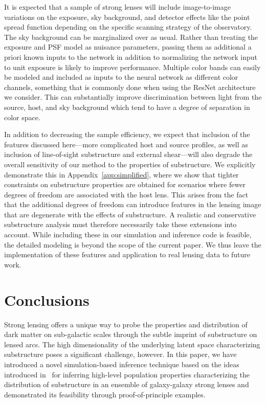 \documentclass[twocolumn]{aastex63}
\begin{document}
It is expected that a sample of strong lenses will include image-to-image variations on the exposure, sky background, and detector effects like the point spread function depending on the specific scanning strategy of the observatory. The sky background can be marginalized over as usual. Rather than treating the exposure and PSF model as nuisance parameters, passing them as additional a priori known inputs to the network in addition to normalizing the network input to unit exposure is likely to improve performance. Multiple color bands can easily be modeled and included as inputs to the neural network as different color channels, something that is commonly done when using the ResNet architecture we consider. This can substantially improve discrimination between light from the source, host, and sky background which tend to have a degree of separation in color space.

In addition to decreasing the sample efficiency, we expect that inclusion of the features discussed here---more complicated host and source profiles, as well as inclusion of line-of-sight substructure and external shear---will also degrade the overall sensitivity of our method to the properties of substructure. We explicitly demonstrate this in Appendix~\ref{app:simplified}, where we show that tighter constraints on substructure properties are obtained for scenarios where fewer degrees of freedom are associated with the host lens. This arises from the fact that the additional degrees of freedom can introduce features in the lensing image that are degenerate with the effects of substructure. A realistic and conservative substructure analysis must therefore necessarily take these extensions into account. While including these in our simulation and inference code is feasible, the detailed modeling is beyond the scope of the current paper. We thus leave the implementation of these features and application to real lensing data to future work.

\section{Conclusions}
\label{sec:conclusions}

Strong lensing offers a unique way to probe the properties and distribution of dark matter on sub-galactic scales through the subtle imprint of substructure on lensed arcs. The high dimensionality of the underlying latent space characterizing substructure poses a significant challenge, however. In this paper, we have introduced a novel simulation-based inference technique based on the ideas introduced in~\citet{Cranmer:2015bka, 1805.00013, 1805.00020, 1805.12244, Stoye:2018ovl} for inferring high-level population properties characterizing the distribution of substructure in an ensemble of galaxy-galaxy strong lenses and demonstrated its feasibility through proof-of-principle examples.
\end{document}
